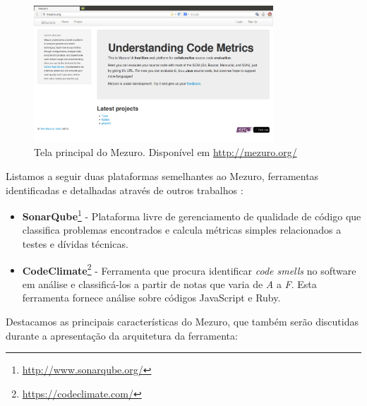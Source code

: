 %

\graphicspath{{figuras/}}
\begin{figure}[h]
\centering
\includegraphics[width=0.8\textwidth]{mezuro-standalone}
\caption{Tela principal do Mezuro. Disponível em \url{http://mezuro.org/}}
\label{mezuro}
\end{figure}

%

Listamos a seguir duas plataformas semelhantes ao Mezuro, ferramentas identificadas e detalhadas  através de outros trabalhos \cite{meirelles2010mezuro}\cite{vieira2013}\cite{manzo2014}:

%

\begin{itemize}
\item \textbf{SonarQube}\footnote{\url{http://www.sonarqube.org/}} - Plataforma livre de gerenciamento de qualidade de código que classifica problemas encontrados e calcula métricas simples relacionados a testes e dívidas técnicas.
\item \textbf{CodeClimate}\footnote{\url{https://codeclimate.com/}} - Ferramenta que procura identificar \emph{code smells} no software em análise e classificá-los a partir de notas que varia de \emph{A} a \emph{F}. Esta ferramenta fornece análise sobre códigos JavaScript e Ruby.
\end{itemize}

%

Destacamos as principais características do Mezuro, que também serão discutidas durante a apresentação da arquitetura da ferramenta:

%

